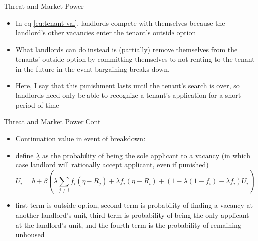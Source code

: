 \documentclass[10pt, xcolor=dvipsnames]{beamer}
\begin{document}
\begin{frame}{Threat and Market Power}
    \begin{itemize}
    \item In eq \ref{eq:tenant-val}, landlords compete with themselves because the landlord's other vacancies enter the tenant's outside option
    \item What landlords can do instead is (partially) remove themselves from the tenants' outside option by committing themselves to not renting to the tenant in the future in the event bargaining breaks down.
    \item Here, I say that this punishment lasts until the tenant's search is over, so landlords need only be able to recognize a tenant's application for a short period of time
    \end{itemize}
\end{frame}

\begin{frame}{Threat and Market Power Cont}
    \begin{itemize}
         \item Continuation value in event of breakdown:
        \item define \textbf{$\underline{\lambda}$} as the probability of being the sole applicant to a vacancy (in which case landlord will rationally accept applicant, even if punished)
        \begin{equation}\label{eq:match-val}
            U_i = b + \beta \left(\lambda\sum_{j\neq i}f_i(\eta - R_j) + \underline{\lambda} f_i(\eta - R_i) + (1-\lambda(1-f_i) - \underline{\lambda} f_i)U_i\right)
        \end{equation}
        \item first term is outside option, second term is probability of finding a vacancy at another landlord's unit, third term is probability of being the only applicant at the landlord's unit, and the fourth term is the probability of remaining unhoused
    \end{itemize}
\end{frame}
\end{document}
